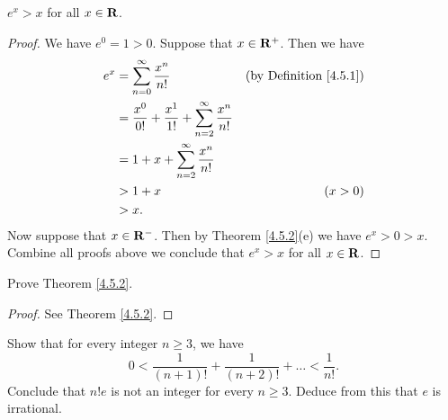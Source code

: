 \begin{additional corollary}\label{ac 4.5.1}
\(e^x > x\) for all \(x \in \mathbf{R}\).
\end{additional corollary}

\begin{proof}
    We have \(e^0 = 1 > 0\).
    Suppose that \(x \in \mathbf{R}^+\).
    Then we have
    \begin{align*}
        e^x & = \sum_{n = 0}^\infty \frac{x^n}{n!}                                   & \text{(by Definition \ref{4.5.1})} \\
            & = \frac{x^0}{0!} + \frac{x^1}{1!} + \sum_{n = 2}^\infty \frac{x^n}{n!}                                      \\
            & = 1 + x + \sum_{n = 2}^\infty \frac{x^n}{n!}                                                                \\
            & > 1 + x                                                                & (x > 0)                            \\
            & > x.
    \end{align*}
    Now suppose that \(x \in \mathbf{R}^-\).
    Then by Theorem \ref{4.5.2}(e) we have \(e^x > 0 > x\).
    Combine all proofs above we conclude that \(e^x > x\) for all \(x \in \mathbf{R}\).
\end{proof}

\exercisesection

\begin{exercise}\label{ex 4.5.1}
    Prove Theorem \ref{4.5.2}.
\end{exercise}

\begin{proof}
    See Theorem \ref{4.5.2}.
\end{proof}

\begin{exercise}\label{ex 4.5.2}
    Show that for every integer \(n \geq 3\), we have
    \[
        0 < \frac{1}{(n + 1)!} + \frac{1}{(n + 2)!} + \dots < \frac{1}{n!}.
    \]
    Conclude that \(n! e\) is not an integer for every \(n \geq 3\).
    Deduce from this that \(e\) is irrational.
\end{exercise}

